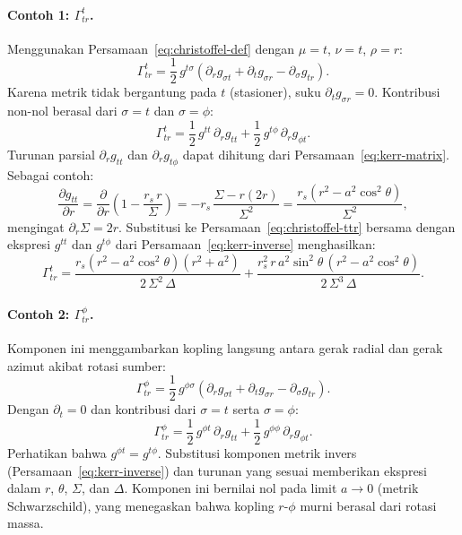 \paragraph{Contoh 1: $\Gamma^t_{tr}$.}
Menggunakan Persamaan~\eqref{eq:christoffel-def} dengan $\mu = t$, $\nu = t$, $\rho = r$:
\begin{equation}
    \Gamma^t_{tr} = \frac{1}{2}\,g^{t\sigma}
    \left(\partial_r g_{\sigma t} + \partial_t g_{\sigma r} - \partial_\sigma g_{tr}\right).
\end{equation}
Karena metrik tidak bergantung pada $t$ (stasioner), suku $\partial_t g_{\sigma r} = 0$. Kontribusi non-nol berasal dari $\sigma = t$ dan $\sigma = \phi$:
\begin{equation}
    \Gamma^t_{tr} = \frac{1}{2}\,g^{tt}\,\partial_r g_{tt}
                  + \frac{1}{2}\,g^{t\phi}\,\partial_r g_{\phi t}.
    \label{eq:christoffel-ttr}
\end{equation}
Turunan parsial $\partial_r g_{tt}$ dan $\partial_r g_{t\phi}$ dapat dihitung dari Persamaan~\eqref{eq:kerr-matrix}. Sebagai contoh:
\begin{equation}
    \frac{\partial g_{tt}}{\partial r}
    = \frac{\partial}{\partial r}\left(1 - \frac{r_s\, r}{\Sigma}\right)
    = -r_s\,\frac{\Sigma - r(2r)}{\Sigma^2}
    = \frac{r_s(r^2 - a^2\cos^2\!\theta)}{\Sigma^2},
    \label{eq:dgtt-dr}
\end{equation}
mengingat $\partial_r \Sigma = 2r$. Substitusi ke Persamaan~\eqref{eq:christoffel-ttr} bersama dengan ekspresi $g^{tt}$ dan $g^{t\phi}$ dari Persamaan~\eqref{eq:kerr-inverse} menghasilkan:
\begin{equation}
    \Gamma^t_{tr} = \frac{r_s(r^2 - a^2\cos^2\!\theta)(r^2 + a^2)}{2\,\Sigma^2\,\Delta}
    + \frac{r_s^2\, r\, a^2\sin^2\!\theta\,(r^2 - a^2\cos^2\!\theta)}{2\,\Sigma^3\,\Delta}.
    \label{eq:gamma-ttr-result}
\end{equation}

\paragraph{Contoh 2: $\Gamma^\phi_{tr}$.}
Komponen ini menggambarkan kopling langsung antara gerak radial dan gerak azimut akibat rotasi sumber:
\begin{equation}
    \Gamma^\phi_{tr} = \frac{1}{2}\,g^{\phi\sigma}
    \left(\partial_r g_{\sigma t} + \partial_t g_{\sigma r} - \partial_\sigma g_{tr}\right).
\end{equation}
Dengan $\partial_t = 0$ dan kontribusi dari $\sigma = t$ serta $\sigma = \phi$:
\begin{equation}
    \Gamma^\phi_{tr} = \frac{1}{2}\,g^{\phi t}\,\partial_r g_{tt}
                     + \frac{1}{2}\,g^{\phi\phi}\,\partial_r g_{\phi t}.
    \label{eq:christoffel-phitr}
\end{equation}
Perhatikan bahwa $g^{\phi t} = g^{t\phi}$. Substitusi komponen metrik invers (Persamaan~\ref{eq:kerr-inverse}) dan turunan yang sesuai memberikan ekspresi dalam $r$, $\theta$, $\Sigma$, dan $\Delta$. Komponen ini bernilai nol pada limit $a \to 0$ (metrik Schwarzschild), yang menegaskan bahwa kopling $r$-$\phi$ murni berasal dari rotasi massa.

